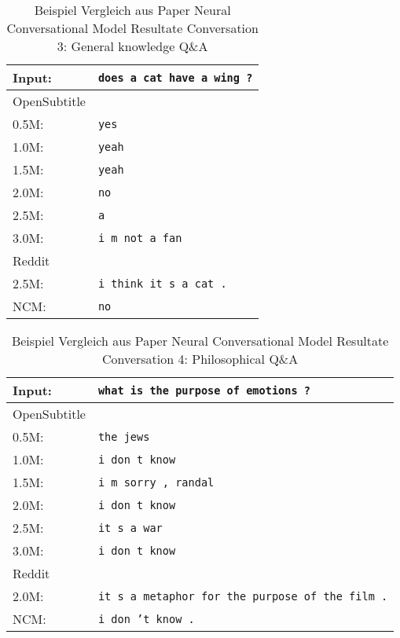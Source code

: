 \begin{table}[H]
	\centering
	\begin{adjustbox}{max width=\textwidth}
		\begin{tabular}{ll}
			\toprule
			Input: 	& \texttt{does a cat have a wing ?}\\
			\midrule
			OpenSubtitle\\
			0.5M: 	& \texttt{yes}\\
			1.0M: 	& \texttt{yeah}\\
			1.5M:	& \texttt{yeah}\\
			2.0M:	& \texttt{no}\\
			2.5M:	& \texttt{a}\\
			3.0M:	& \texttt{i m not a fan}\\
			\midrule
			Reddit\\
			2.5M:	& \texttt{i think it s a cat .}\\
			\midrule
			NCM:	& \texttt{no}\\
			\bottomrule
		\end{tabular}
	\end{adjustbox}
	\caption{Beispiel Vergleich aus Paper Neural Conversational Model Resultate Conversation 3: General knowledge Q\&A}
	\label{results:example17_output: Neural_Conversational_Model_compared}
\end{table}


\begin{table}[H]
	\centering
	\begin{adjustbox}{max width=\textwidth}
		\begin{tabular}{ll}
			\toprule
			Input: 	& \texttt{what is the purpose of emotions ?}\\
			\midrule
			OpenSubtitle\\
			0.5M: 	& \texttt{the jews}\\
			1.0M: 	& \texttt{i don t know}\\
			1.5M:	& \texttt{i m sorry , randal}\\
			2.0M:	& \texttt{i don t know}\\
			2.5M:	& \texttt{it s a war}\\
			3.0M:	& \texttt{i don t know}\\
			\midrule
			Reddit\\
			2.0M:	& \texttt{it s a metaphor for the purpose of the film .}\\
			\midrule
			NCM:	& \texttt{i don ’t know .}\\
			\bottomrule
		\end{tabular}
	\end{adjustbox}
	\caption{Beispiel Vergleich aus Paper Neural Conversational Model Resultate Conversation 4: Philosophical Q\&A}
	\label{results:example17_output: Neural_Conversational_Model_compared}
\end{table}

